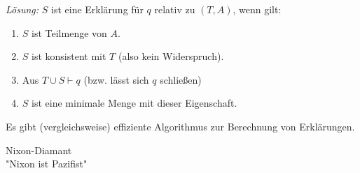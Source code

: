 \documentclass[runningheads,deutsch]{llncs}
\begin{document}
\textit{Lösung:} $S$ ist eine Erklärung für $q$ relativ zu $(T,A)$, wenn gilt:

\begin{enumerate}
    \item $S$ ist Teilmenge von $A$.
    \item $S$ ist konsistent mit $T$ (also kein Widerspruch).
    \item Aus $T \cup S \vdash q$ (bzw. lässt sich $q$ schließen)
    \item $S$ ist eine minimale Menge mit dieser Eigenschaft.
\end{enumerate}

Es gibt (vergleichsweise) effiziente Algorithmus zur Berechnung von Erklärungen.

\begin{example} Nixon-Diamant\\
    "Nixon ist Pazifist"
\end{example}



\pagebreak
\end{document}
